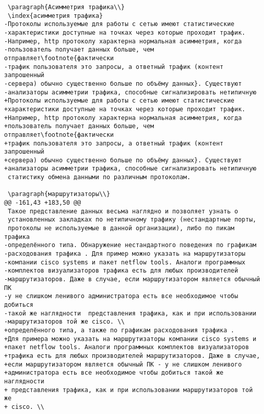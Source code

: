 \begin{verbatim}
 \paragraph{Асимметрия трафика\\}
 \index{асимметрия трафика}
-Протоколы используемые для работы с сетью имеют статистические
-характеристики доступные на точках через которые проходит трафик.
-Например, http протоколу характерна нормальная асимметрия, когда
-пользователь получает данных больше, чем отправляет\footnote{фактически
-трафик пользователя это запросы, а ответный трафик (контент запрошенный
-сервера) обычно существенно больше по объёму данных}. Существуют
-анализаторы асимметрии трафика, способные сигнализировать нетипичную
+Протоколы используемые для работы с сетью имеют статистические
+характеристики доступные на точках через которые проходит трафик.
+Например, http протоколу характерна нормальная асимметрия, когда
+пользователь получает данных больше, чем отправляет\footnote{фактически
+трафик пользователя это запросы, а ответный трафик (контент запрошенный
+сервера) обычно существенно больше по объёму данных}. Существуют
+анализаторы асимметрии трафика, способные сигнализировать нетипичную
 статистику обмена данными по различным протоколам.

 \paragraph{маршрутизаторы\\}
@@ -161,43 +183,50 @@
 Такое представление данных весьма наглядно и позволяет узнать о
 установленных закладках по нетипичному трафику (нестандартные порты,
 протоколы не используемые в данной организации), либо по пикам трафика
-определённого типа. Обнаружение нестандартного поведения по графикам
-расходования трафика . Для пример можно указать на маршрутизаторы
-компании cisco systems и пакет netflow tools. Аналоги программных
-комплектов визуализаторов трафика есть для любых производителей
-маршрутизаторов. Даже в случае, если маршрутизатором является обычный ПК
-у не слишком ленивого администратора есть все необходимое чтобы добиться
-такой же наглядности  представления трафика, как и при использовании
-маршрутизаторов той же cisco. \\
+определённого типа, а также по графикам расходования трафика .
+Для примера можно указать на маршрутизаторы компании cisco systems и
+пакет netflow tools. Аналоги программных комплектов визуализаторов
+трафика есть для любых производителей маршрутизаторов. Даже в случае,
+если маршрутизатором является обычный ПК - у не слишком ленивого
+администратора есть все необходимое чтобы добиться такой же наглядности
+ представления трафика, как и при использовании маршрутизаторов той же
+ cisco. \\


\end{verbatim}
